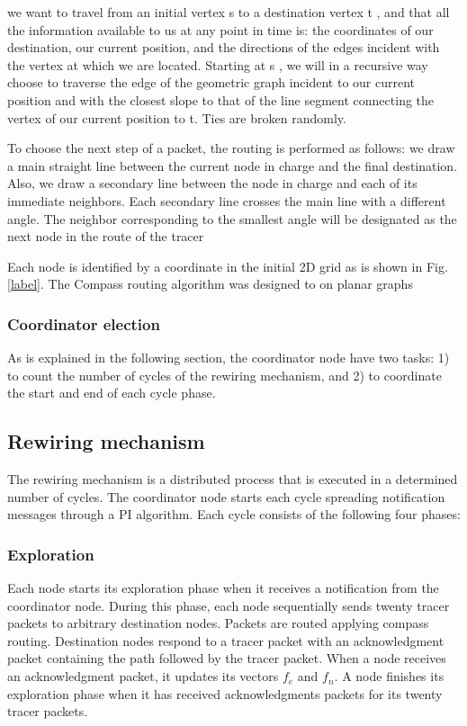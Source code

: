 we want to travel from an initial vertex s to a destination vertex t , and that all the information available to us at any point in time is: the coordinates of our destination, our current position, and the directions of the edges incident with the vertex at which we are located. Starting at s , we will in a recursive way choose to traverse the edge of the geometric graph incident to our current position and with the closest
slope to that of the line segment connecting the vertex of our current position to t. Ties are broken randomly.

To choose the next step of a packet, the routing is performed as follows: we draw a main straight line between the current node in charge and the final destination. Also, we draw
a secondary line between the node in charge and each of its immediate neighbors. Each secondary
line crosses the main line with a different angle. The neighbor corresponding to the
smallest angle will be designated as the next node in the route of the tracer

Each node is identified by a coordinate in the initial 2D grid as is shown in Fig. \ref{label}.
The Compass routing algorithm was designed to on planar graphs

\subsubsection{Coordinator election}

As is explained in the following section, the coordinator node have two tasks: 1) to count the number of cycles of the rewiring mechanism, and 2) to coordinate the start and end of each cycle phase.



\subsection{Rewiring mechanism}

The rewiring mechanism is a distributed process that is executed in a determined number of cycles. The coordinator node starts each cycle spreading notification messages through a PI algorithm. Each cycle consists of the following four phases:

\subsubsection{Exploration}

Each node starts its exploration phase when it receives a notification from the coordinator node. During this phase, each node sequentially sends twenty tracer packets to arbitrary destination nodes. Packets are routed applying compass routing. Destination nodes respond to a tracer packet with an acknowledgment packet containing the path followed by the tracer packet.
When a node receives an acknowledgment packet, it updates its vectors $f_e$ and $f_n$. A node finishes its exploration phase when it has received acknowledgments packets for its twenty tracer packets.

